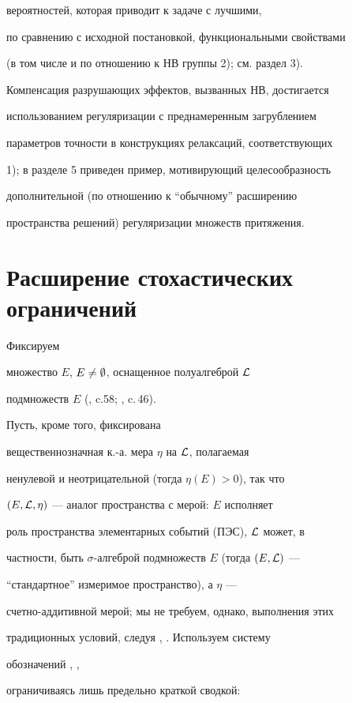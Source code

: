 вероятностей, которая приводит к задаче с лучшими,


по сравнению с исходной постановкой, функциональными свойствами


(в том числе и по отношению к НВ группы 2); см. раздел 3).


Компенсация разрушающих эффектов, вызванных НВ, достигается


использованием регуляризации с преднамеренным загрублением


параметров точности в конструкциях релаксаций, соответствующих


1); в разделе 5 приведен пример, мотивирующий целесообразность


дополнительной (по отношению к ``обычному'' расширению


пространства решений) регуляризации множеств притяжения.





\section{Расширение стохастических ограничений}





Фиксируем


множество $E$, $E\ne\emptyset$, оснащенное полуалгеброй ${\cal L}$


подмножеств $E$ (\cite{Ch1}, c.58; \cite{Nev}, c.\,46).


Пусть, кроме того, фиксирована


вещественнозначная к.-а. мера $\eta$ на ${\cal L}$, полагаемая


ненулевой и неотрицательной (тогда $\eta(E) > 0$), так что 


$(E,{\cal L}, \eta)$ --- аналог пространства с мерой: $E$ исполняет


роль пространства элементарных событий (ПЭС), ${\cal L}$ может, в


частности, быть $\sigma$-алгеброй подмножеств $E$ (тогда $(E, {\cal L})$ ---


``стандартное'' измеримое пространство), а $\eta$ ---


счетно-аддитивной мерой; мы не требуем, однако, выполнения этих


традиционных условий, следуя \cite{Ch2}, \cite{Ch3}. Используем систему


обозначений \cite{Ch2}, \cite{Ch3},


ограничиваясь лишь предельно краткой сводкой:


